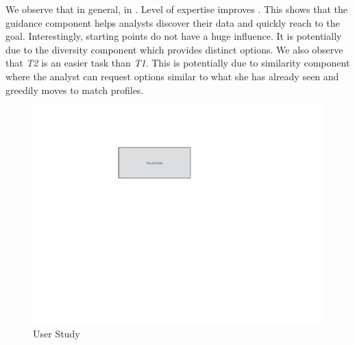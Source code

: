 We observe that in general,  in \framework. Level of expertise improves . This shows that the guidance component helps analysts discover their data and quickly reach to the goal. Interestingly, starting points do not have a huge influence. It is potentially due to the diversity component which provides distinct options. We also observe that {\em T2} is an easier task than {\em T1}. This is potentially due to similarity component where the analyst can request options similar to what she has already seen and greedily moves to match profiles.

\begin{figure}[t]
 \centering
 \includegraphics[width=\columnwidth]{figs/placeholder}
\caption{User Study}
\label{fig:userstudy}
\end{figure}


